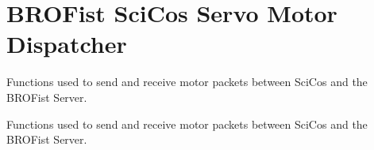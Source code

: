 \hypertarget{group___b_r_o_cos_mot_dispatcher}{
\section{BROFist SciCos Servo Motor Dispatcher}
\label{group___b_r_o_cos_mot_dispatcher}
}


Functions used to send and receive motor packets between SciCos and the BROFist Server.  


Functions used to send and receive motor packets between SciCos and the BROFist Server. 